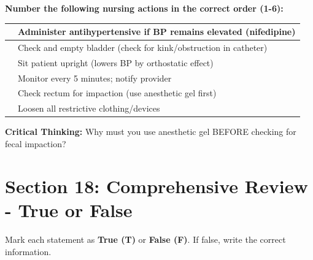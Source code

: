 \documentclass[11pt]{article}
\begin{document}
\textbf{Number the following nursing actions in the correct order (1-6):}

\vspace{0.3cm}

\begin{tabular}{|c|p{11cm}|}
\hline
\underline{\hspace{0.8cm}} & Administer antihypertensive if BP remains elevated (nifedipine) \\
\hline
\underline{\hspace{0.8cm}} & Check and empty bladder (check for kink/obstruction in catheter) \\
\hline
\underline{\hspace{0.8cm}} & Sit patient upright (lowers BP by orthostatic effect) \\
\hline
\underline{\hspace{0.8cm}} & Monitor every 5 minutes; notify provider \\
\hline
\underline{\hspace{0.8cm}} & Check rectum for impaction (use anesthetic gel first) \\
\hline
\underline{\hspace{0.8cm}} & Loosen all restrictive clothing/devices \\
\hline
\end{tabular}

\vspace{0.5cm}

\textbf{Critical Thinking:} Why must you use anesthetic gel BEFORE checking for fecal impaction?

\underline{\hspace{12cm}}

\underline{\hspace{12cm}}

\vspace{1cm}

\section*{Section 18: Comprehensive Review - True or False}

Mark each statement as \textbf{True (T)} or \textbf{False (F)}. If false, write the correct information.

\vspace{0.5cm}
\end{document}
